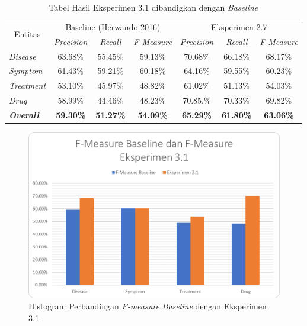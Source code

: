     \begin{table}
    	\centering
    	\caption{Tabel Hasil Eksperimen 3.1 dibandigkan dengan \textit{Baseline}}
    	\begin{tabular}{|l|c|c|c|c|c|c|}
    		\hline
    		\multicolumn{1}{|c|}{\multirow{2}{*}{Entitas}} & \multicolumn{3}{c|}{Baseline (Herwando 2016)} & \multicolumn{3}{c|}{Eksperimen 2.7} \\ \cline{2-7} 
    		\multicolumn{1}{|c|}{} & \textit{Precision} & \textit{Recall} & \textit{F-Measure} & \textit{Precision} & \textit{Recall} & \textit{F-Measure} \\ \hline
    		\textit{Disease} & 63.68\% & 55.45\% & 59.13\% & 70.68\% & 66.18\% & 68.17\% \\ \hline
    		\textit{Symptom} & 61.43\% & 59.21\% & 60.18\% & 64.16\% & 59.55\% & 60.23\% \\ \hline
    		\textit{Treatment} & 53.10\% & 45.97\% & 48.82\% & 61.02\% & 51.13\% & 54.03\% \\ \hline
    		\textit{Drug} & 58.99\% & 44.46\% & 48.23\% & 70.85.\% & 70.33\% & 69.82\% \\ \hline
    		\textit{\textbf{Overall}} & \textbf{59.30\%} & \textbf{51.27\%} & \textbf{54.09\%} & \textbf{65.29\%} & \textbf{61.80\%} & \textbf{63.06\%} \\ \hline
    	\end{tabular}
    	\label{table:owndict9}
    \end{table}
    
    \begin{figure}
    	\centering
    	\includegraphics[width=0.85\linewidth]{images/histogram9}
    	\caption{Histogram Perbandingan \textit{F-measure} \textit{Baseline} dengan Eksperimen 3.1}
    	\label{fig:owndict9}
    \end{figure}
    
